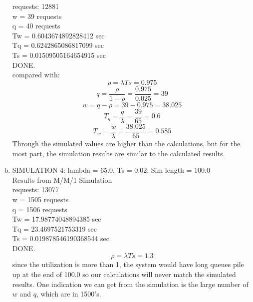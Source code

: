 \documentclass{article}   	                         %
\begin{document}
\begin{enumerate}[(a)]
requests: 12881\\
w = 39  requests\\
q = 40  requests\\
Tw = 0.6043674892828412 sec\\
Tq = 0.6242865086817099  sec\\
Ts = 0.01509505164654915  sec\\
DONE.\\
compared with:\\
$$\rho = \lambda Ts = 0.975$$
$$q = \frac{\rho}{1-\rho} = \frac{0.975}{0.025} = 39$$
$$w = q-\rho = 39-0.975 = 38.025$$
$$T_q = \frac{q}{\lambda} = \frac{39}{65} = 0.6$$
$$T_w = \frac{w}{\lambda} = \frac{38.025}{65} = 0.585$$
Through the simulated values are higher than the calculations, but for the most part, the simulation results are similar to the calculated results.\\
\item
SIMULATION 4: lambda = 65.0, Ts = 0.02, Sim length = 100.0\\
Results from M/M/1 Simulation\\
requests: 13077\\
w = 1505  requests\\
q = 1506  requests\\
Tw = 17.98774048894385 sec\\
Tq = 23.4697521753319  sec\\
Ts = 0.019878546190368544  sec\\
DONE.\\
$$\rho = \lambda Ts = 1.3$$
since the utilization is more than 1, the system would have long queues pile up at the end of 100.0 so our calculations will never match the simulated results. One indication we can get from the simulation is the large number of $w$ and $q$, which are in 1500's.\\

\end{enumerate}
\end{document}
